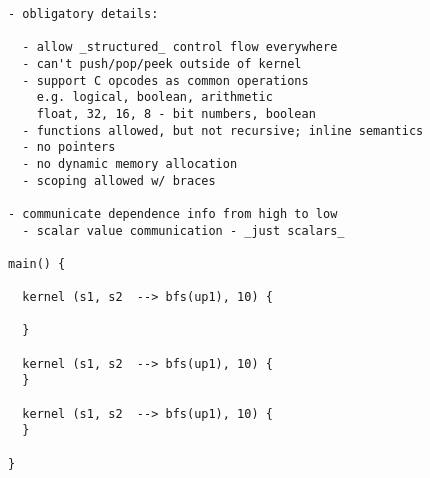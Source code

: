 \begin{verbatim}
- obligatory details:

  - allow _structured_ control flow everywhere
  - can't push/pop/peek outside of kernel
  - support C opcodes as common operations
    e.g. logical, boolean, arithmetic
    float, 32, 16, 8 - bit numbers, boolean
  - functions allowed, but not recursive; inline semantics
  - no pointers
  - no dynamic memory allocation
  - scoping allowed w/ braces

- communicate dependence info from high to low
  - scalar value communication - _just scalars_

main() {

  kernel (s1, s2  --> bfs(up1), 10) {

  }

  kernel (s1, s2  --> bfs(up1), 10) {
  }

  kernel (s1, s2  --> bfs(up1), 10) {
  }

}

\end{verbatim}
